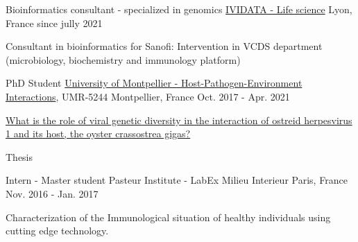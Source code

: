 

\begin{cventries}

 \cventry
    {Bioinformatics consultant - specialized in genomics} %
    {\href{https://www.ividata.com/}{IVIDATA - Life science}} %
    {Lyon, France} %
    {since jully 2021} %
    {
      \begin{cvitems} %
        \item {Consultant in bioinformatics for Sanofi: Intervention in VCDS department (microbiology, biochemistry and immunology platform)}
      \end{cvitems}
    }
    
   \cventry
    {PhD Student}%
    {\href{http://ihpe.univ-perp.fr/}{University of Montpellier - Host-Pathogen-Environment Interactions}, UMR-5244} %
    {Montpellier, France} %
    {Oct. 2017 - Apr. 2021} %
    {
      \begin{cvitems} %
        \item {\href{https://www.theses.fr/2021MONTG012}{What is the role of viral genetic diversity in the interaction of ostreid herpesvirus 1 and its host, the oyster crassostrea gigas?}}
        \item {Thesis}
      \end{cvitems}
    }
  \cventry
    {Intern - Master student} %
    {Pasteur Institute - LabEx Milieu Interieur} %
    {Paris, France} %
    {Nov. 2016 - Jan. 2017} %
    {
      \begin{cvitems} %
        \item {Characterization of the Immunological situation of healthy individuals using cutting edge technology.}
      \end{cvitems}
    }


\end{cventries}
